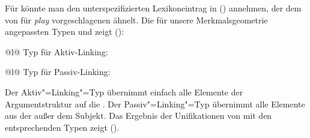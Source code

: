 Für  könnte man den unterspezifizierten Lexikoneintrag in ()
annehmen, der dem von \citet[]{Koenig99a} für \emph{play} vorgeschlagenen ähnelt.
\ea
{}
\z
Die für unsere Merkmalsgeometrie angepassten Typen  und  zeigt ():
\eal
\ex 
\begin{tabular}[t]{@{}l@{}}
Typ für Aktiv-Linking:\\
\end{tabular}
\ex\label{constr-passive-linking}
\begin{tabular}[t]{@{}l@{}} 
Typ für Passiv-Linking:\\
\end{tabular}
\zl
Der Aktiv"=Linking"=Typ übernimmt einfach alle Elemente der Argumentstruktur auf die \compsl.
Der Passiv"=Linking"=Typ übernimmt alle Elemente aus der \argstl außer dem Subjekt.
Das Ergebnis der Unifikationen von  mit den entsprechenden Typen zeigt ().
